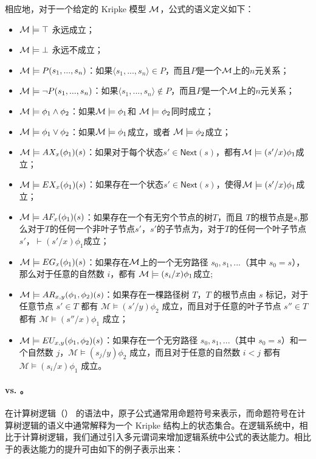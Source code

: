 相应地，对于一个给定的 Kripke 模型 $\cal M$，公式的语义定义如下：
\begin{itemize}
	\item ${\cal M}\models \top$ 永远成立；
	\item ${\cal M}\models \bot$ 永远不成立；
	\item ${\cal M}\models P(s_1,...,s_n)$：如果$\langle s_1,...,s_n\rangle\in P$，而且$P$是一个$\cal M$上的$n$元关系；
	\item ${\cal M}\models \neg P(s_1,...,s_n)$：如果$\langle s_1,...,s_n\rangle\notin P$，而且$P$是一个$\cal M$上的$n$元关系；
	\item ${\cal M}\models \phi_1\wedge\phi_2$：如果${\cal M}\models \phi_1$和 ${\cal M}\models \phi_2$同时成立；
	\item ${\cal M}\models \phi_1\vee\phi_2$：如果${\cal M}\models \phi_1$成立，或者 ${\cal M}\models \phi_2$成立；
	\item ${\cal M}\models AX_x(\phi_1)(s)$：如果对于每个状态$s'\in\textsf{Next}(s)$，都有${\cal M}\models (s'/x)\phi_1$成立；
	\item ${\cal M}\models EX_x(\phi_1)(s)$：如果存在一个状态$s'\in\textsf{Next}(s)$，使得${\cal M}\models (s'/x)\phi_1$成立；
	\item ${\cal M}\models AF_x(\phi_1)(s)$：如果存在一个有无穷个节点的树$T$，而且 $T$的根节点是$s$,那么对于$T$的任何一个非叶子节点$s'$，$s'$的子节点为，对于$T$的任何一个叶子节点$s'$，$\vdash (s'/x)\phi_1$成立；
	\item ${\cal M}\models EG_x(\phi_1)(s)$：如果存在$\cal M$上的一个无穷路径 $s_0,s_1,...$（其中 $s_0 = s$），那么对于任意的自然数 $i$，都有 ${\cal M}\models (s_i/x)\phi_1$成立;
	\item ${\cal M}\models AR_{x, y}(\phi_1,\phi_2)(s)$：如果存在一棵路径树 $T$，$T$ 的根节点由 $s$ 标记，对于任意节点 $s'\in T$ 都有 $\mathcal{M}\models (s'/y)\phi_2$ 成立，而且对于任意的叶子节点 $s''\in T$ 都有 $\mathcal{M}\models (s''/x)\phi_1$ 成立；
	\item ${\cal M}\models EU_{x, y}(\phi_1,\phi_2)(s)$：如果存在一个无穷路径 $s_0,s_1,...$（其中 $s_0=s$）和一个自然数 $j$，$\mathcal{M}\models(s_j/y)\phi_2$ 成立，而且对于任意的自然数 $i<j$ 都有 $\mathcal{M}\models (s_i/x)\phi_1$ 成立。
\end{itemize}


\paragraph{\CTL{} vs. \CTLP{}。}在计算树逻辑（\CTL）\cite{EmersonC82,EmersonH85} 的语法中，原子公式通常用命题符号来表示，而命题符号在计算树逻辑的语义中通常解释为一个 Kripke 结构上的状态集合。在逻辑系统\CTLP{}中，相比于计算树逻辑，我们通过引入多元谓词来增加逻辑系统中公式的表达能力。\CTLP{}相比于\CTL{}的表达能力的提升可由如下的例子表示出来：

